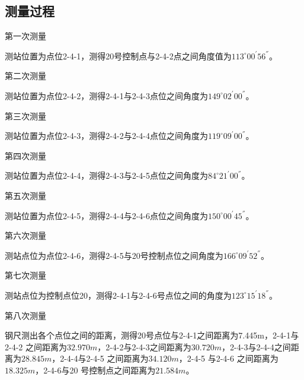 \documentclass[UTF8]{ctexart}
\begin{document}
	\subsection{测量过程}
	第一次测量
	
	测站位置为点位2-4-1，测得20号控制点与2-4-2点之间角度值为$ 113^{\circ}00^{'}56^{''} $。
	
	第二次测量
	
	测站位置为点位2-4-2，测得2-4-1与2-4-3点位之间角度为$ 149^{\circ}02^{'}00^{''} $。
	
	第三次测量
	
	测站位置为点位2-4-3，测得2-4-2与2-4-4点位之间角度为$ 119^{\circ}09^{'}00^{''} $。
	
	第四次测量
	
	测站位置为点位2-4-4，测得2-4-3与2-4-5点位之间角度为$ 84^{\circ}21^{'}00^{''} $。
	
	第五次测量
	
	测站位置为点位2-4-5，测得2-4-4与2-4-6点位之间角度为$ 150^{\circ}00^{'}45^{''} $。
	
	第六次测量
	
	测站点位为点位2-4-6，测得2-4-5与20号控制点位之间角度为$ 166^{\circ}09^{'}52^{''} $。
	
	第七次测量
	
	测站点位为控制点位20，测得2-4-1与2-4-6号点位之间的角度为$ 123^{\circ}15^{'}18^{''} $。
	
	第八次测量
	
	钢尺测出各个点位之间的距离，测得20号点位与2-4-1之间距离为7.445m，2-4-1与2-4-2 之间距离为$ 32.970m $，2-4-2与2-4-3之间距离为$ 30.720m $，2-4-3与2-4-4之间距离为$ 28.845m $，2-4-4与2-4-5 之间距离为$ 34.120m $，2-4-5 与2-4-6 之间距离为$ 18.325m $，2-4-6与20 号控制点之间距离为$ 21.584m $。
	\newpage
\end{document}

